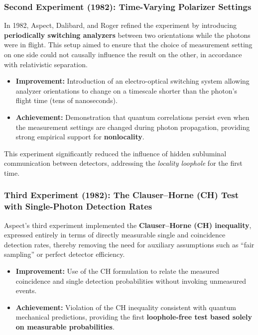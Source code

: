 \subsubsection{Second Experiment (1982): Time-Varying Polarizer Settings}

In 1982, Aspect, Dalibard, and Roger refined the experiment by introducing \textbf{periodically switching analyzers} between two orientations while the photons were in flight.  
This setup aimed to ensure that the choice of measurement setting on one side could not causally influence the result on the other, in accordance with relativistic separation.

\begin{itemize}
    \item \textbf{Improvement:} Introduction of an electro-optical switching system allowing analyzer orientations to change on a timescale shorter than the photon’s flight time (tens of nanoseconds).
    \item \textbf{Achievement:} Demonstration that quantum correlations persist even when the measurement settings are changed during photon propagation, providing strong empirical support for \textbf{nonlocality}.
\end{itemize}

This experiment significantly reduced the influence of hidden subluminal communication between detectors, addressing the \textit{locality loophole} for the first time.

\subsubsection{Third Experiment (1982): The Clauser–Horne (CH) Test with Single-Photon Detection Rates}

Aspect’s third experiment implemented the \textbf{Clauser–Horne (CH) inequality}, expressed entirely in terms of directly measurable single and coincidence detection rates, thereby removing the need for auxiliary assumptions such as “fair sampling” or perfect detector efficiency.

\begin{itemize}
    \item \textbf{Improvement:} Use of the CH formulation to relate the measured coincidence and single detection probabilities without invoking unmeasured events.
    \item \textbf{Achievement:} Violation of the CH inequality consistent with quantum mechanical predictions, providing the first \textbf{loophole-free test based solely on measurable probabilities}.
\end{itemize}

